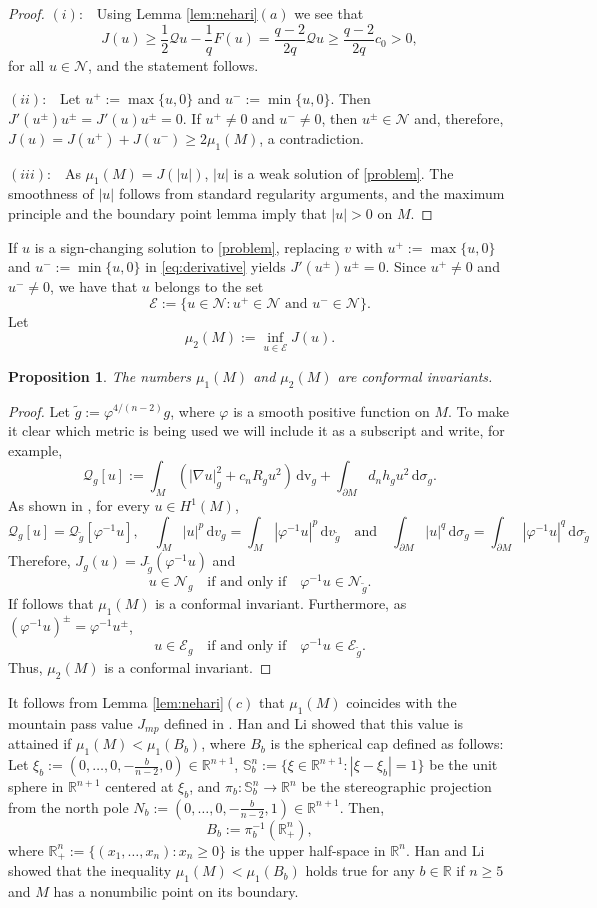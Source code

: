 \documentclass[reqno,11pt,oneside]{amsart}
\newtheorem{proposition}[theorem]{Proposition}
\numberwithin{equation}{section}
\def\r{\mathbb{R}}
\def\rn{\mathbb{R}^n}
\def\sn{\mathbb{S}^n}
\def\im{\int_{M}}
\def\idm{\int_{\partial M}}
\def\vp{\varphi}
\def\cE{\mathcal{E}}
\def\cN{\mathcal{N}}
\def\tilde{\widetilde}
\def\d{\,\mathrm{d}}
\def\dv{\,\mathrm{dv}}
\begin{document}
\begin{proof}
$(i):$ \ Using Lemma \ref{lem:nehari}$(a)$ we see that
$$J(u)\geq\frac{1}{2}\mathscr{Q}u-\frac{1}{q} F(u)=\frac{q-2}{2q}\mathscr{Q}u\geq\frac{q-2}{2q}c_0>0,$$
for all $u\in\cN$, and the statement follows.

$(ii):$ \ Let $u^+:=\max\{u,0\}$ and $u^-:=\min\{u,0\}$. Then $J'(u^\pm)u^\pm=J'(u)u^\pm=0$. If $u^+\neq 0$ and $u^-\neq 0$, then $u^\pm\in\cN$ and, therefore, $J(u)=J(u^+)+J(u^-)\geq 2\mu_1(M)$, a contradiction.

$(iii):$ \ As $\mu_1(M)=J(|u|)$, $|u|$ is a weak solution of \eqref{problem}. The smoothness of $|u|$ follows from standard regularity arguments, and the maximum principle and the boundary point lemma imply that $|u|>0$ on $M$.
\end{proof}

If $u$ is a sign-changing solution to \eqref{problem}, replacing $v$ with $u^+:=\max\{u,0\}$ and $u^-:=\min\{u,0\}$ in \eqref{eq:derivative} yields $J'(u^\pm)u^\pm=0$. Since $u^+\neq 0$ and $u^-\neq 0$, we have that $u$ belongs to the set
$$\cE:=\{u\in\cN:u^+\in\cN\text{ and }u^-\in\cN\}.$$
Let
$$\mu_2(M):=\inf_{u\in\cE}J(u).$$

\begin{proposition} \label{prop:mu is invariant}
The numbers $\mu_1(M)$ and $\mu_2(M)$ are conformal invariants.
\end{proposition}

\begin{proof}
Let $\tilde{g}:=\vp^{4/(n-2)}g$, where $\vp$ is a smooth positive function on $M$. To make it clear which metric is being used we will include it as a subscript and write, for example,
$$\mathscr{Q}_g[u]:=\im(|\nabla u|_g^2+c_nR_gu^2)\dv_g+\idm d_nh_gu^2\d \sigma_g.$$
As shown in \cite[(1.8), (1.9) and (1.10)]{e00}, for every $u\in H^1(M)$,
$$\mathscr{Q}_g[u]=\mathscr{Q}_{\tilde{g}}[\vp^{-1}u],\quad\im|u|^p\d v_g=\im|\vp^{-1}u|^p\d v_{\tilde{g}}\quad\text{and}\quad\idm|u|^q\d\sigma_g=\idm|\vp^{-1}u|^q\d\sigma_{\tilde{g}}$$
Therefore, $J_g(u)=J_{\tilde{g}}(\vp^{-1}u)$ and
$$u\in\cN_g\quad\text{if and only if}\quad \vp^{-1}u\in\cN_{\tilde{g}}.$$
If follows that $\mu_1(M)$ is a conformal invariant. Furthermore, as $(\vp^{-1}u)^\pm=\vp^{-1}u^\pm$,
$$u\in\cE_g\quad\text{if and only if}\quad \vp^{-1}u\in\cE_{\tilde{g}}.$$
Thus, $\mu_2(M)$ is a conformal invariant.
\end{proof}

It follows from Lemma \ref{lem:nehari}$(c)$ that $\mu_1(M)$ coincides with the mountain pass value $J_{mp}$ defined in \cite[p. 812]{hl}. Han and Li showed that this value is attained if $\mu_1(M)<\mu_1(B_b)$, where $B_b$ is the spherical cap defined as follows: Let $\xi_b:=(0,\ldots,0,-\frac{b}{n-2},0)\in\r^{n+1}$, $\sn_b:=\{\xi\in\r^{n+1}:|\xi-\xi_b|=1\}$ be the unit sphere in $\r^{n+1}$ centered at $\xi_b$, and $\pi_b:\sn_b\to\rn$ be the stereographic projection from the north pole $N_b:=(0,\ldots,0,-\frac{b}{n-2},1)\in\r^{n+1}$. Then,
$$B_b:=\pi_b^{-1}(\rn_+),$$
where $\rn_+:=\{(x_1,\ldots,x_n):x_n\geq 0\}$ is the upper half-space in $\rn$. Han and Li showed that the inequality $\mu_1(M)<\mu_1(B_b)$ holds true for any $b\in\r$ if $n\geq 5$ and $M$ has a nonumbilic point on its boundary.
  
\end{document}
